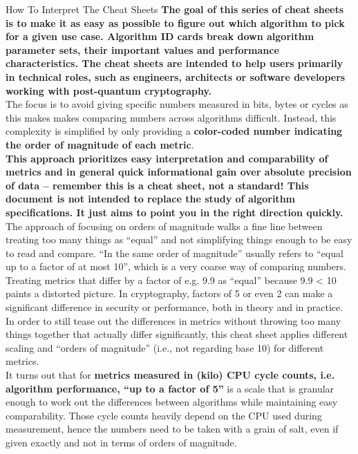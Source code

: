 \begin{minipage}[t]{0.58\textwidth} %
    \vspace{-3mm}
    \begin{algorithmbox}{How To Interpret The Cheat Sheets}
        \scriptsize
        {\bfseries The goal of this series of cheat sheets is to make it as easy as possible to figure out which algorithm to pick for a given use case. Algorithm ID cards break down algorithm parameter sets, their important values and performance characteristics. The cheat sheets are intended to help users primarily in technical roles, such as engineers, architects or software developers working with post-quantum cryptography.}\\[\baselineskip]

        The focus is to avoid giving specific numbers measured in bits, bytes or cycles as this makes makes comparing numbers across algorithms difficult. Instead, this complexity is simplified by only providing a
        {\bfseries color-coded number indicating the order of magnitude of each metric}.\\[\baselineskip]

        {\bfseries This approach prioritizes easy interpretation and comparability of metrics and in general quick informational gain over absolute precision of data -- remember this is a cheat sheet, not a standard! This document is not intended to replace the study of algorithm specifications. It just aims to point you in the right direction quickly.}\\[\baselineskip]

        The approach of focusing on orders of magnitude walks a fine line between treating too many things as ``equal'' and not simplifying things enough to be easy to read and compare. ``In the same order of magnitude'' usually refers to ``equal up to a factor of at most 10'', which is a very coarse way of comparing numbers. Treating metrics that differ by a factor of e.g. 9.9 as ``equal'' because 9.9 < 10 paints a distorted picture. In cryptography, factors of 5 or even 2 can make a significant difference in security or performance, both in theory and in practice. In order to still tease out the differences in metrics without throwing too many things together that actually differ significantly, this cheat sheet applies different scaling and ``orders of magnitude'' (i.e., not regarding base 10) for different metrics.\\[\baselineskip]


        It turns out that for {\bfseries metrics measured in (kilo) CPU cycle counts, i.e. algorithm performance, ``up to a factor of 5''} is a scale that is granular enough to work out the differences between algorithms while maintaining easy comparability. Those cycle counts heavily depend on the CPU used during measurement, hence the numbers need to be taken with a grain of salt, even if given exactly and not in terms of orders of magnitude.\\[\baselineskip]


\end{algorithmbox}
\end{minipage}
